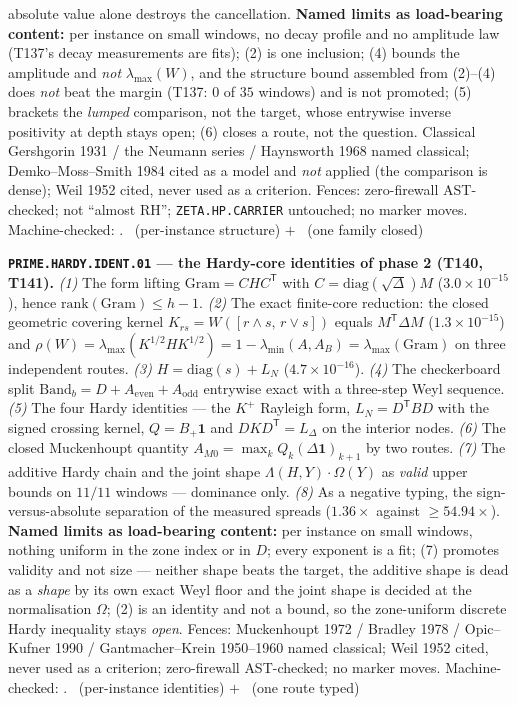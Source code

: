 absolute value alone destroys the cancellation.
\textbf{Named limits as load-bearing content:} per instance on small windows, no
decay profile and no amplitude law (T137's decay measurements are fits); (2) is
one inclusion; (4) bounds the amplitude and \emph{not} $\lambda_{\max}(W)$, and
the structure bound assembled from (2)--(4) does \emph{not} beat the margin
(T137: $0$ of $35$ windows) and is not promoted; (5) brackets the \emph{lumped}
comparison, not the target, whose entrywise inverse positivity at depth stays
open; (6) closes a route, not the question. Classical Gershgorin 1931 / the
Neumann series / Haynsworth 1968 named classical; Demko--Moss--Smith 1984 cited
as a model and \emph{not} applied (the comparison is dense); Weil 1952 cited,
never used as a criterion. Fences: zero-firewall AST-checked; not ``almost RH'';
\texttt{ZETA.HP.CARRIER} untouched; no marker moves.
Machine-checked: .
\mE\ (per-instance structure) $+$ \mX\ (one family closed)


\par\smallskip\noindent\textbf{\texttt{PRIME.HARDY.IDENT.01} --- the Hardy-core
identities of phase 2 (T140, T141).}
\emph{(1)} The form lifting $\mathrm{Gram}=CHC^{\mathsf T}$ with
$C=\mathrm{diag}(\sqrt\Delta)M$ ($3.0\times10^{-15}$), hence
$\mathrm{rank}(\mathrm{Gram})\le h-1$. \emph{(2)} The exact finite-core reduction:
the closed geometric covering kernel $K_{rs}=W([r\wedge s,\,r\vee s])$ equals
$M^{\mathsf T}\Delta M$ ($1.3\times10^{-15}$) and
$\rho(W)=\lambda_{\max}(K^{1/2}HK^{1/2})=1-\lambda_{\min}(A,A_B)=\lambda_{\max}(\mathrm{Gram})$
on three independent routes. \emph{(3)} $H=\mathrm{diag}(s)+L_N$
($4.7\times10^{-16}$). \emph{(4)} The checkerboard split
$\mathrm{Band}_b=D+A_{\mathrm{even}}+A_{\mathrm{odd}}$ entrywise exact with a
three-step Weyl sequence. \emph{(5)} The four Hardy identities --- the $K^{+}$
Rayleigh form, $L_N=D^{\mathsf T}BD$ with the signed crossing kernel,
$Q=B_+\mathbf 1$ and $DKD^{\mathsf T}=L_\Delta$ on the interior nodes.
\emph{(6)} The closed Muckenhoupt quantity $A_{M0}=\max_kQ_k(\Delta\mathbf 1)_{k+1}$
by two routes. \emph{(7)} The additive Hardy chain and the joint shape
$\Lambda(H,Y)\cdot\Omega(Y)$ as \emph{valid} upper bounds on $11/11$ windows ---
dominance only. \emph{(8)} As a negative typing, the sign-versus-absolute
separation of the measured spreads ($1.36\times$ against $\ge54.94\times$).
\textbf{Named limits as load-bearing content:} per instance on small windows,
nothing uniform in the zone index or in $D$; every exponent is a fit; (7) promotes
validity and not size --- neither shape beats the target, the additive shape is
dead as a \emph{shape} by its own exact Weyl floor and the joint shape is decided
at the normalisation $\Omega$; (2) is an identity and not a bound, so the
zone-uniform discrete Hardy inequality stays \emph{open}. Fences: Muckenhoupt
1972 / Bradley 1978 / Opic--Kufner 1990 / Gantmacher--Krein 1950--1960 named
classical; Weil 1952 cited, never used as a criterion; zero-firewall AST-checked;
no marker moves.
Machine-checked: .
\mE\ (per-instance identities) $+$ \mX\ (one route typed)


